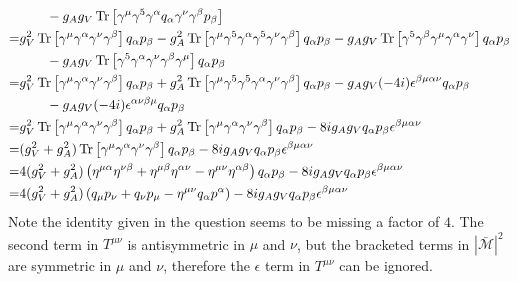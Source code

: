 \documentclass[12pt,a4]{article}
\begin{document}
\begin{enumerate}
\begin{enumerate}
\begin{align*}
                       & \qquad -  g_A g_V\Tr\left[\gamma^\mu \gamma^5 \gamma^\alpha q_\alpha \gamma^\nu  \gamma^\beta p_\beta \right]\\
                      =& g_V^2 \Tr\left[\gamma^\mu  \gamma^\alpha \gamma^\nu \gamma^\beta \right]q_\alpha p_\beta - g_A^2 \Tr\left[\gamma^\mu \gamma^5 \gamma^\alpha \gamma^5\gamma^\nu \gamma^\beta  \right]q_\alpha  p_\beta-  g_A g_V\Tr\left[\gamma^5 \gamma^\beta \gamma^\mu \gamma^\alpha \gamma^\nu   \right]q_\alpha p_\beta\\
                       & \qquad -  g_A g_V\Tr\left[\gamma^5 \gamma^\alpha \gamma^\nu  \gamma^\beta \gamma^\mu \right]q_\alpha p_\beta \\
                      =& g_V^2 \Tr\left[\gamma^\mu  \gamma^\alpha \gamma^\nu \gamma^\beta \right]q_\alpha p_\beta + g_A^2 \Tr\left[\gamma^\mu \gamma^5 \gamma^5 \gamma^\alpha \gamma^\nu  \gamma^\beta  \right]q_\alpha  p_\beta-  g_A g_V(-4 i)\epsilon^{\beta \mu \alpha \nu} q_\alpha p_\beta\\
                       & \qquad -  g_A g_V (-4 i)\epsilon^{\alpha \nu\beta \mu } q_\alpha p_\beta \\
                      =& g_V^2 \Tr\left[\gamma^\mu  \gamma^\alpha \gamma^\nu \gamma^\beta \right]q_\alpha p_\beta + g_A^2 \Tr\left[\gamma^\mu \gamma^\alpha \gamma^\nu \gamma^\beta  \right]q_\alpha  p_\beta - 8 i g_A g_V q_\alpha p_\beta \epsilon^{\beta \mu \alpha \nu} \\
                      =& (g_V^2 + g_A^2)\Tr\left[\gamma^\mu  \gamma^\alpha \gamma^\nu \gamma^\beta \right]q_\alpha p_\beta  - 8 i g_A g_V q_\alpha p_\beta \epsilon^{\beta \mu \alpha \nu} \\
                      =& 4 (g_V^2 + g_A^2)\left(\eta^{\mu \alpha} \eta^{\nu \beta} + \eta^{\mu\beta}  \eta^{\alpha \nu} - \eta^{\mu\nu}  \eta^{\alpha\beta}\right) q_\alpha p_\beta  - 8 i g_A g_V q_\alpha p_\beta \epsilon^{\beta \mu \alpha \nu} \\
                      =& 4 (g_V^2 + g_A^2)\left( q_\mu p_\nu +  q_\nu p_\mu - \eta^{\mu\nu}  q_\alpha p^\alpha\right)   - 8 i g_A g_V q_\alpha p_\beta \epsilon^{\beta \mu \alpha \nu}
        \end{align*}
        Note the identity given in the question seems to be missing a factor of $4$.
        The second term in $T^{\mu \nu}$ is antisymmetric in $\mu$ and $\nu$, but the bracketed terms in $|\bar{\mathcal{M}}|^2$ are symmetric in $\mu$ and $\nu$, therefore the $\epsilon$ term in $T^{\mu\nu}$ can be ignored.
        \begin{align*}

\end{align*}
\end{enumerate}
\end{enumerate}
\end{document}
